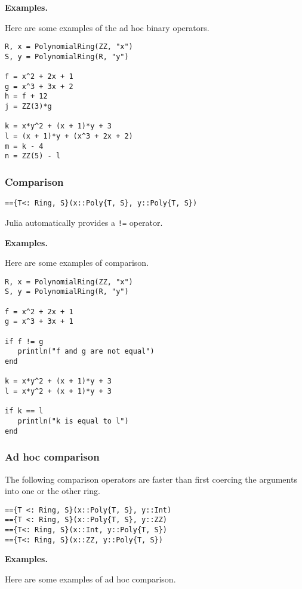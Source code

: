 \documentclass[a4paper,10pt]{article}
\newcommand{\code}{\lstinline}
\begin{document}
{{{\textbf{Examples.}

Here are some examples of the ad hoc binary operators.

\begin{lstlisting}
R, x = PolynomialRing(ZZ, "x")
S, y = PolynomialRing(R, "y")

f = x^2 + 2x + 1
g = x^3 + 3x + 2
h = f + 12
j = ZZ(3)*g

k = x*y^2 + (x + 1)*y + 3
l = (x + 1)*y + (x^3 + 2x + 2)
m = k - 4
n = ZZ(5) - l
\end{lstlisting}

\subsubsection{Comparison}

\begin{lstlisting}
=={T<: Ring, S}(x::Poly{T, S}, y::Poly{T, S})
\end{lstlisting}

Julia automatically provides a \code{!=} operator.

\textbf{Examples.}

Here are some examples of comparison.

\begin{lstlisting}
R, x = PolynomialRing(ZZ, "x")
S, y = PolynomialRing(R, "y")

f = x^2 + 2x + 1
g = x^3 + 3x + 1

if f != g
   println("f and g are not equal")
end

k = x*y^2 + (x + 1)*y + 3
l = x*y^2 + (x + 1)*y + 3

if k == l
   println("k is equal to l")
end
\end{lstlisting}

\subsubsection{Ad hoc comparison}

The following comparison operators are faster than first coercing the arguments
into one or the other ring.

\begin{lstlisting}
=={T <: Ring, S}(x::Poly{T, S}, y::Int)
=={T <: Ring, S}(x::Poly{T, S}, y::ZZ)
=={T<: Ring, S}(x::Int, y::Poly{T, S})
=={T<: Ring, S}(x::ZZ, y::Poly{T, S})
\end{lstlisting}

\textbf{Examples.}

Here are some examples of ad hoc comparison.

}}}
\end{document}
